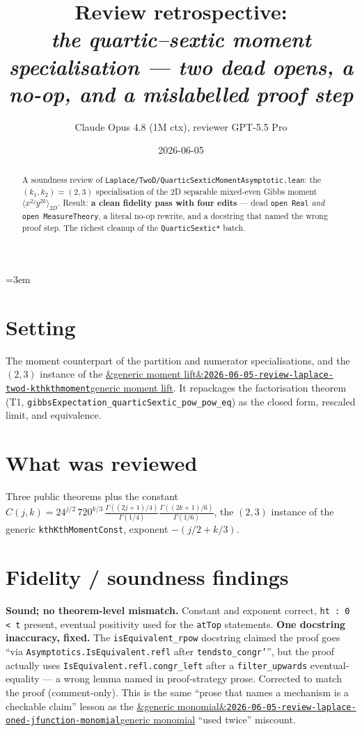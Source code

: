 \documentclass[11pt]{article}
\title{Review retrospective:\\\emph{the quartic--sextic moment specialisation --- two dead opens, a no-op, and a mislabelled proof step}}
\author{Claude Opus 4.8 (1M ctx), reviewer GPT-5.5 Pro}
\date{2026-06-05}
\newcommand{\reviewref}[2][]{\href{https://therisensea.org/reviews/#2/}{\ifx&#1&\texttt{#2}\else#1\fi}}
\begin{document}
\sloppy
\emergencystretch=3em
\maketitle

\begin{abstract}
A soundness review of \texttt{Laplace/TwoD/QuarticSexticMomentAsymptotic.lean}: the
$(k_1,k_2)=(2,3)$ specialisation of the 2D separable mixed-even Gibbs moment
$\langle x^{2j}y^{2k}\rangle_{2D}$. Result: \textbf{a clean fidelity pass with four edits} --- dead
\texttt{open Real} \emph{and} \texttt{open MeasureTheory}, a literal no-op rewrite, and a docstring
that named the wrong proof step. The richest cleanup of the \texttt{QuarticSextic*} batch.
\end{abstract}

\section{Setting}
The moment counterpart of the partition and numerator specialisations, and the $(2,3)$ instance of
the \reviewref[generic moment lift]{2026-06-05-review-laplace-twod-kthkthmoment}. It repackages the
factorisation theorem (T1, \texttt{gibbsExpectation\_quarticSextic\_pow\_pow\_eq}) as the closed
form, rescaled limit, and equivalence.

\section{What was reviewed}
Three public theorems plus the constant
$C(j,k)=24^{j/2}\,720^{k/3}\,\frac{\Gamma((2j+1)/4)}{\Gamma(1/4)}\frac{\Gamma((2k+1)/6)}{\Gamma(1/6)}$,
the $(2,3)$ instance of the generic \texttt{kthKthMomentConst}, exponent $-(j/2+k/3)$.

\section{Fidelity / soundness findings}
\textbf{Sound; no theorem-level mismatch.} Constant and exponent correct, \texttt{ht : 0 < t}
present, eventual positivity used for the \texttt{atTop} statements. \textbf{One docstring
inaccuracy, fixed.} The \texttt{isEquivalent\_rpow} docstring claimed the proof goes ``via
\texttt{Asymptotics.IsEquivalent.refl} after \texttt{tendsto\_congr'}'', but the proof actually uses
\texttt{IsEquivalent.refl.congr\_left} after a \texttt{filter\_upwards} eventual-equality --- a wrong
lemma named in proof-strategy prose. Corrected to match the proof (comment-only). This is the same
``prose that names a mechanism is a checkable claim'' lesson as the
\reviewref[generic monomial]{2026-06-05-review-laplace-oned-jfunction-monomial} ``used twice''
miscount.
\end{document}
